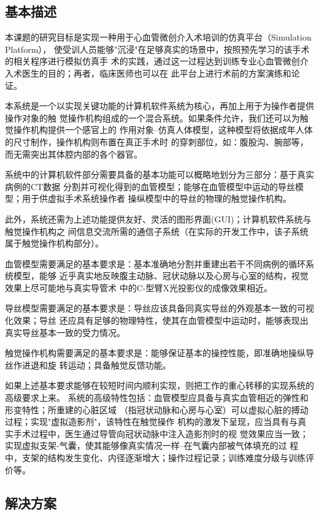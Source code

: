 \subsection{基本描述}
\label{subsec1-1-2}

本课题的研究目标是实现一种用于心血管微创介入术培训的仿真平台（Simulation Platform），
使受训人员能够"沉浸"在足够真实的场景中，按照预先学习的该手术的相关程序进行模拟仿真手
术的实践，通过这一过程达到训练专业心血管微创介入术医生的目的；再者，临床医师也可以在
此平台上进行术前的方案演练和论证。

本系统是一个以实现关键功能的计算机软件系统为核心，再加上用于为操作者提供操作对象的触
觉操作机构组成的一个混合系统。如果条件允许，我们还可以为触觉操作机构提供一个感官上的
作用对象--仿真人体模型，这种模型将依据成年人体的尺寸制作，操作机构则布置在真正手术时
的穿刺部位，如：腹股沟、腕部等，而无需突出其体腔内部的各个器官。

系统中的计算机软件部分需要具备的基本功能可以概略地划分为三部分：基于真实病例的CT数据
分割并可视化得到的血管模型；能够在血管模型中运动的导丝模型；用于供虚拟手术系统操作者
操纵模型中的导丝的物理的触觉操作机构。

此外，系统还需为上述功能提供友好、灵活的图形界面(GUI)；计算机软件系统与触觉操作机构之
间信息交流所需的通信子系统（在实际的开发工作中，该子系统属于触觉操作机构部分）。

血管模型需要满足的基本要求是：基本准确地分割并重建出若干不同病例的循环系统模型，能够
近乎真实地反映腹主动脉、冠状动脉以及心房与心室的结构，视觉效果上尽可能地与真实导管术
中的C-型臂X光投影仪的成像效果相近。

导丝模型需要满足的基本要求是：导丝应该具备同真实导丝的外观基本一致的可视化效果；导丝
还应具有足够的物理特性，使其在血管模型中运动时，能够表现出真实导丝基本一致的受力情况。

触觉操作机构需要满足的基本要求是：能够保证基本的操控性能，即准确地操纵导丝作进退和旋
转运动；具备触觉反馈功能。

如果上述基本要求能够在较短时间内顺利实现，则把工作的重心转移的实现系统的高级要求上来。
系统的高级特性包括：血管模型应具备与真实血管相近的弹性和形变特性；所重建的心脏区域
（指冠状动脉和心房与心室）可以虚拟心脏的搏动过程；实现"虚拟造影剂"，该特性在触觉操作
机构的激发下呈现，应当具有与真实手术过程中，医生通过导管向冠状动脉中注入造影剂时的视
觉效果应当一致；实现虚拟支架-气囊，使其能够像真实情况一样--在气囊内部被气体填充的过
程中，支架的结构发生变化、内径逐渐增大；操作过程记录；训练难度分级与训练评价等。

\subsection{解决方案}
\label{subsec1-1-3}


